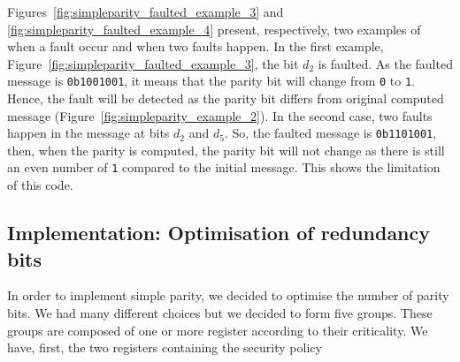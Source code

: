 Figures~\ref{fig:simpleparity_faulted_example_3} and \ref{fig:simpleparity_faulted_example_4} present, respectively, two examples of when a fault occur and when two faults happen.
In the first example, Figure~\ref{fig:simpleparity_faulted_example_3}, the bit $d_2$ is faulted. As the faulted message is \texttt{0b1001001}, it means that the parity bit will change from \texttt{0} to \texttt{1}. Hence, the fault will be detected as the parity bit differs from original computed message (Figure~\ref{fig:simpleparity_example_2}).
In the second case, two faults happen in the message at bits $d_2$ and $d_5$. So, the faulted message is \texttt{0b1101001}, then, when the parity is computed, the parity bit will not change as there is still an even number of \texttt{1} compared to the initial message. This shows the limitation of this code.

\subsection{Implementation: Optimisation of redundancy bits}

In order to implement simple parity, we decided to optimise the number of parity bits. We had many different choices but we decided to form five groups. These groups are composed of one or more register according to their criticality. We have, first, the two registers containing the security policy

